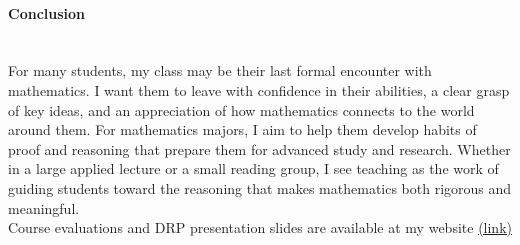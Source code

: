 \documentclass[11pt]{article}
\begin{document}
\paragraph{Conclusion} \quad \\
For many students, my class may be their last formal encounter with mathematics. I want them to leave with confidence in their abilities, a clear grasp of key ideas, and an appreciation of how mathematics connects to the world around them. For mathematics majors, I aim to help them develop habits of proof and reasoning that prepare them for advanced study and research. Whether in a large applied lecture or a small reading group, I see teaching as the work of guiding students toward the reasoning that makes mathematics both rigorous and meaningful.
\\

\noindent Course evaluations and DRP presentation slides are available at my website \href{https://sites.google.com/view/myungsin-cho/teaching?authuser=0}{(link)}
\end{document}
